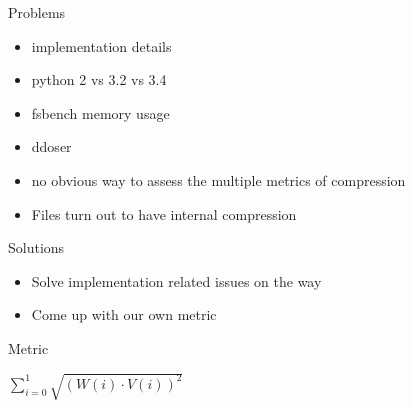\documentclass[10pt, compress]{beamer}
\begin{document}
\begin{frame}{Problems}
    \begin{itemize}  
        \item implementation details
        \item python 2 vs 3.2 vs 3.4
        \item fsbench memory usage
        \item ddoser
        \item no obvious way to assess the multiple metrics of compression
        \item Files turn out to have internal compression
    \end{itemize}
\end{frame}

\begin{frame}{Solutions}
    \begin{itemize}
        \item Solve implementation related issues on the way
        \item Come up with our own metric
    \end{itemize}
\end{frame}

\begin{frame}{Metric}
    \begin{center}
        \(
        \sum\limits^{1}_{i=0} \sqrt{(W(i) \cdot V(i))^2}
        \)
    \end{center}
    \begin{table}
    \begin{center}
    \caption{Metric, Ratio : Compression speed : Decompression Speed}
    \label{tab:metric}
    \end{center}
    \end{table}

\end{frame}
\end{document}
